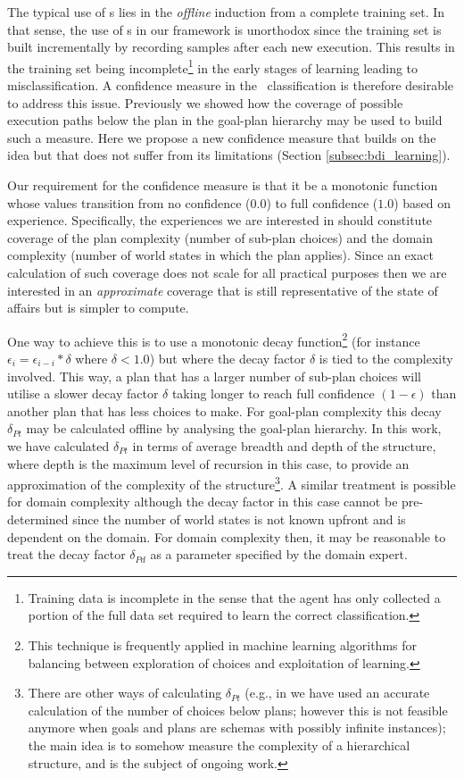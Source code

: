 The typical use of \dt s lies in the \textit{offline} induction from a complete training set. In that sense, the use of \dt s in our framework is unorthodox since the training set is built incrementally by recording samples after each new execution. This results in the training set being incomplete\footnote{Training data is incomplete in the sense that the agent has only collected a portion of the full data set required to learn the correct classification.} in the early stages of learning leading to misclassification. A confidence measure in the \dt\ classification is therefore desirable to address this issue. Previously \cite{Singh:AAMAS10} we showed how the coverage of possible execution paths below the plan in the goal-plan hierarchy may be used to build such a measure. Here we propose a new confidence measure that builds on the idea but that does not suffer from its limitations (Section \ref{subsec:bdi_learning}).

Our requirement for the confidence measure is that it be a monotonic function whose values transition from no confidence ($0.0$) to full confidence ($1.0$) based on experience. Specifically, the experiences we are interested in should constitute coverage of the plan complexity (number of sub-plan choices) and the domain complexity (number of world states in which the plan applies). Since an exact calculation of such coverage does not scale for all practical purposes then we are interested in an \textit{approximate} coverage that is still representative of the state of affairs but is simpler to compute.

One way to achieve this is to use a monotonic decay function\footnote{This technique is frequently applied in machine learning algorithms for balancing between exploration of choices and exploitation of learning.} (for instance $\epsilon_i = \epsilon_{i-i} * \delta$ where $\delta < 1.0$) but where the decay factor $\delta$ is tied to the complexity involved. This way, a plan that has a larger number of sub-plan choices will utilise a slower decay factor $\delta$ taking longer to reach full confidence $(1-\epsilon)$ than another plan that has less choices to make. For goal-plan complexity this decay $\delta_{Pt}$ may be calculated offline by analysing the goal-plan hierarchy. In this work, we have calculated $\delta_{Pt}$ in terms of average breadth and depth of the structure, where depth is the maximum level of recursion in this case, to provide an approximation of the complexity of the structure\footnote{There are other ways of calculating $\delta_{Pt}$ (e.g., in \cite{Singh:AAMAS10} we have used an accurate calculation of the number of choices below plans; however this is not feasible anymore when goals and plans are schemas with possibly infinite instances); the main idea is to somehow measure the complexity of a hierarchical structure, and is the subject of ongoing work.}. A similar treatment is possible for domain complexity although the decay factor in this case cannot be pre-determined since the number of world states is not known upfront and is dependent on the domain. For domain complexity then, it may be reasonable to treat the decay factor $\delta_{Pd}$ as a parameter specified by the domain expert.

